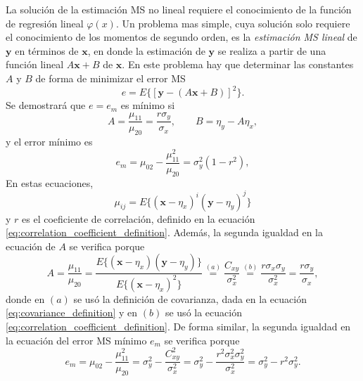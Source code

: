 \documentclass[a4paper]{report}
\newcommand{\x}{\mathbf{x}}
\newcommand{\y}{\mathbf{y}}
\begin{document}
La solución de la estimación MS no lineal requiere el conocimiento de la función de regresión lineal \(\varphi(x)\). Un problema mas simple, cuya solución solo requiere el conocimiento de los momentos de segundo orden, es la \emph{estimación MS lineal} de \(\y\) en términos de \(\x\), en donde la estimación de \(\y\) se realiza a partir de una función lineal \(A\x+B\) de \(\x\). En este problema hay que determinar las constantes \(A\) y \(B\) de forma de minimizar el error MS
\begin{equation}\label{eq:linear_mse}
 e=E\{[\y-(A\x+B)]^2\}.
\end{equation}
Se demostrará que \(e=e_m\) es mínimo si
\[
 A=\frac{\mu_{11}}{\mu_{20}}=\frac{r\sigma_y}{\sigma_x},\qquad B=\eta_y-A\eta_x,
\]
y el error mínimo es
\[
 e_m=\mu_{02}-\frac{\mu_{11}^2}{\mu_{20}}=\sigma_y^2(1-r^2),
\]
En estas ecuaciones,
\[
 \mu_{ij}=E\{(\x-\eta_x)^i(\y-\eta_y)^j\}
\]
y \(r\) es el coeficiente de correlación, definido en la ecuación \ref{eq:correlation_coefficient_definition}. Además, la segunda igualdad en la ecuación de \(A\) se verifica porque
\[
 A=\frac{\mu_{11}}{\mu_{20}}=\frac{E\{(\x-\eta_x)(\y-\eta_y)\}}{E\{(\x-\eta_x)^2\}}\overset{(a)}{=}\frac{C_{xy}}{\sigma^2_x}\overset{(b)}{=}\frac{r\sigma_x\sigma_y}{\sigma_x^2}=\frac{r\sigma_y}{\sigma_x},
\]
donde en \((a)\) se usó la definición de covarianza, dada en la ecuación \ref{eq:covariance_definition} y  en \((b)\) se usó la ecuación \ref{eq:correlation_coefficient_definition}. De forma similar, la segunda igualdad en la ecuación del error MS mínimo \(e_m\) se verifica porque
\[
 e_m=\mu_{02}-\frac{\mu_{11}^2}{\mu_{20}}=\sigma_y^2-\frac{C_{xy}^2}{\sigma_x^2}
 =\sigma_y^2-\frac{r^2\sigma_x^2\sigma_y^2}{\sigma_x^2}=\sigma_y^2-r^2\sigma_y^2.
\]
\end{document}
